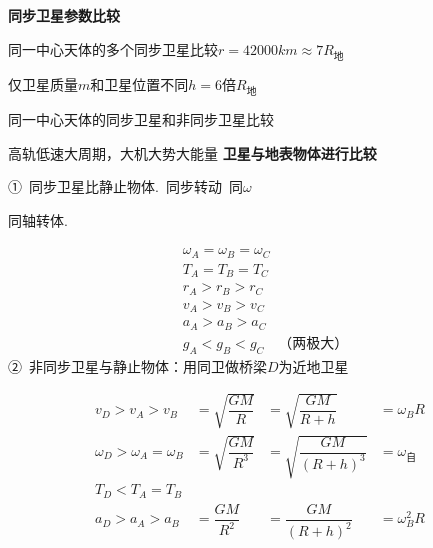 \textbf{同步卫星参数比较}

同一中心天体的多个同步卫星比较\hfill $r=42000\unit{km}\approx7R_{\text{地}}$

\hspace*{2em}仅卫星质量$m$和卫星位置不同\hfill $h=6$倍$R_{\text{地}}$

同一中心天体的同步卫星和非同步卫星比较

\hspace*{4em}高轨低速大周期，大机大势大能量
\textbf{卫星与地表物体进行比较}

①\ 同步卫星比静止物体.\ 同步转动\ 同$\omega$

同轴转体.%


\[
\begin{aligned}
&\omega_A=\omega_B=\omega_C\\
&T_A=T_B=T_C\\
&r_A>r_B>r_C\\
&v_A>v_B>v_C\\
&a_A>a_B>a_C\\
&g_A<g_B<g_C\quad\text{（两极大）}
\end{aligned}
\]
②\ 非同步卫星与静止物体：用同卫做桥梁\quad $D$为近地卫星%

\[
\begin{array}{llll}
v_D>v_A>v_B & =\sqrt{\dfrac{GM}{R}} & =\sqrt{\dfrac{GM}{R+h}} & =\omega_BR\\[8pt]
\omega_D>\omega_A=\omega_B & =\sqrt{\dfrac{GM}{R^{3}}} & =\sqrt{\dfrac{GM}{(R+h)^{3}}} & =\omega_{\text{自}}\\[8pt]
T_D<T_A=T_B & & & \\[4pt]
a_D>a_A>a_B & =\dfrac{GM}{R^{2}} & =\dfrac{GM}{(R+h)^{2}} & =\omega_B^{2}R
\end{array}
\]

